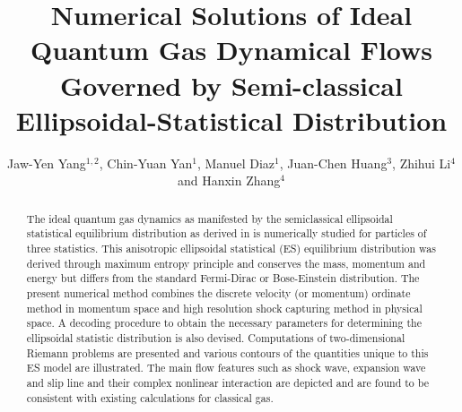 \documentclass{rsproca}%
\begin{document}
\title{Numerical Solutions of Ideal Quantum Gas Dynamical Flows Governed by Semi-classical Ellipsoidal-Statistical Distribution}

\author{%
Jaw-Yen Yang$^{1,2}$, Chin-Yuan Yan$^{1}$, Manuel Diaz$^{1}$, Juan-Chen Huang$^{3}$, Zhihui Li$^{4}$ and Hanxin Zhang$^{4}$}

\address{$^{1}$Institute of Applied Mechanics, National Taiwan University, Taipei 10764, TAIWAN\\
$^{2}$Center for Advanced Study in Theoretical Science, National Taiwan University, Taipei 10764, TAIWAN\\
$^{3}$Department of Merchant Marine, National Taiwan Ocean University, Taipei 10764, TAIWAN\\
$^{4}$China Aerodynamics Research and Development Center, Mianyang, 621000, CHINA}


\subject{Semi-classical Boltzmann equation, Semi-classical Ellipsoidal Statistical Model, Kinetic Numerical Method, Quantum Gas Dynamical Flows}



\begin{abstract}
The ideal quantum gas dynamics as manifested by the semiclassical ellipsoidal statistical equilibrium distribution as derived in \cite{Wu2012} is numerically studied for particles of three statistics.  This anisotropic ellipsoidal statistical (ES) equilibrium distribution was derived through maximum entropy principle and conserves the mass, momentum and energy but differs from the standard Fermi-Dirac or Bose-Einstein distribution. The present numerical method combines the discrete velocity (or momentum) ordinate method in momentum space and high resolution shock capturing method in physical space.   A decoding procedure to obtain the necessary parameters for determining the ellipsoidal statistic distribution is also devised.  Computations of two-dimensional Riemann problems are presented and various contours of the quantities unique to this ES model are illustrated.  The main flow features such as shock wave, expansion wave and slip line and their complex nonlinear interaction are depicted and are found to be consistent with existing calculations for classical gas.
\end{abstract}
\end{document}
